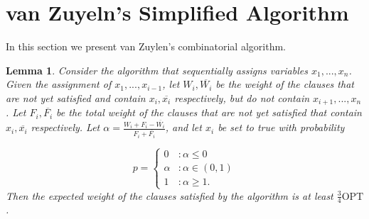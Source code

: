 \documentclass[11pt,letter]{article}
\newtheorem{lemma}[theorem]{Lemma}
\numberwithin{theorem}{section}
\begin{document}
\section{van Zuyeln's Simplified Algorithm}\label{S:vZ}

In this section we present van Zuylen's combinatorial algorithm.

\begin{lemma}
Consider the algorithm that sequentially assigns variables $x_1,...,x_n$. Given the assignment of $x_1,...,x_{i-1}$,
 let $W_i, \overline{W_i}$ be the weight of the clauses that are not yet satisfied and contain $x_i, \overline{x_i}$ respectively,
 but do not contain $x_{i+1}, ..., x_n$. Let $F_i, \overline{F_i}$ be the total weight of the clauses that are not yet satisfied
 that contain $x_i, \overline{x_i}$ respectively. Let $\alpha = \frac{W_i + F_i - \overline{W_i}}{F_i + \overline{F_i}}$, and let $x_i$ be set to true with probability

\begin{displaymath}
  p = \left\{
     \begin{array}{lr}
       0 & : \alpha \leq 0\\
       \alpha & : \alpha \in (0,1) \\
       1 & : \alpha \geq 1.
     \end{array}
   \right.
\end{displaymath}
Then the expected weight of the clauses satisfied by the algorithm is at least $\frac{3}{4} \textrm{OPT}$.
\end{lemma}
\end{document}

